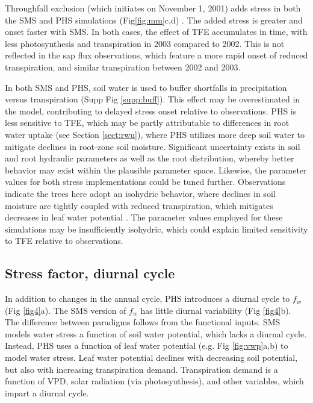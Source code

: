 \documentclass[draft,linenumbers]{agujournal}
\begin{document}
Throughfall exclusion (which initiates on November 1, 2001) adds stress in both the SMS and PHS simulations (Fig\ref{fig:mm}c,d) .
The added stress is greater and onset faster with SMS.
In both cases, the effect of TFE accumulates in time, with less photosynthesis and transpiration in 2003 compared to 2002.
This is not reflected in the sap flux observations, which feature a more rapid onset of reduced transpiration, and similar transpiration between 2002 and 2003.

In both SMS and PHS, soil water is used to buffer shortfalls in precipitation versus transpiration (Supp Fig \ref{supp:buff}).
This effect may be overestimated in the model, contributing to delayed stress onset relative to observations.
PHS is less sensitive to TFE, which may be partly attributable to differences in root water uptake (see Section \ref{sect:rwu}), 
where PHS utilizes more deep soil water to mitigate declines in root-zone soil moisture.
Significant uncertainty exists in soil and root hydraulic parameters as well as the root distribution, whereby better behavior may exist within the plausible parameter space.
Likewise, the parameter values for both stress implementations could be tuned further.
Observations indicate the trees here adopt an isohydric behavior, where declines in soil moisture 
are tightly coupled with reduced transpiration, which mitigates decreases in leaf water potential \citep{fisher2006}.
The parameter values employed for these simulations may be insufficiently isohydric, which could explain limited sensitivity to TFE relative to observations.

\subsection{Stress factor, diurnal cycle}

In addition to changes in the annual cycle, PHS introduces a diurnal cycle to $f_w$ (Fig \ref{fig4}a). 
The SMS version of $f_w$ has little diurnal variability (Fig \ref{fig4}b).
The difference between paradigms follows from the functional inputs.
SMS models water stress a function of soil water potential, which lacks a diurnal cycle.
Instead, PHS uses a function of leaf water potential (e.g. Fig \ref{fig:vwp}a,b) to model water stress.
Leaf water potential declines with decreasing soil potential, but also with increasing transpiration demand.
Transpiration demand is a function of VPD, solar radiation (via photosynthesis), and other variables, which impart a diurnal cycle.
\end{document}
